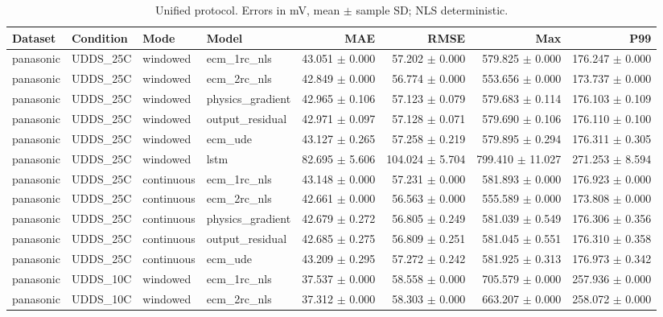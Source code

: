\begin{longtable}{llllrrrr}
\caption{Unified protocol. Errors in mV, mean $\pm$ sample SD; NLS deterministic.}\\
Dataset & Condition & Mode & Model & MAE & RMSE & Max & P99 \\
\hline
panasonic & UDDS\_25C & windowed & ecm\_1rc\_nls & 43.051 $\pm$ 0.000 & 57.202 $\pm$ 0.000 & 579.825 $\pm$ 0.000 & 176.247 $\pm$ 0.000 \\
panasonic & UDDS\_25C & windowed & ecm\_2rc\_nls & 42.849 $\pm$ 0.000 & 56.774 $\pm$ 0.000 & 553.656 $\pm$ 0.000 & 173.737 $\pm$ 0.000 \\
panasonic & UDDS\_25C & windowed & physics\_gradient & 42.965 $\pm$ 0.106 & 57.123 $\pm$ 0.079 & 579.683 $\pm$ 0.114 & 176.103 $\pm$ 0.109 \\
panasonic & UDDS\_25C & windowed & output\_residual & 42.971 $\pm$ 0.097 & 57.128 $\pm$ 0.071 & 579.690 $\pm$ 0.106 & 176.110 $\pm$ 0.100 \\
panasonic & UDDS\_25C & windowed & ecm\_ude & 43.127 $\pm$ 0.265 & 57.258 $\pm$ 0.219 & 579.895 $\pm$ 0.294 & 176.311 $\pm$ 0.305 \\
panasonic & UDDS\_25C & windowed & lstm & 82.695 $\pm$ 5.606 & 104.024 $\pm$ 5.704 & 799.410 $\pm$ 11.027 & 271.253 $\pm$ 8.594 \\
panasonic & UDDS\_25C & continuous & ecm\_1rc\_nls & 43.148 $\pm$ 0.000 & 57.231 $\pm$ 0.000 & 581.893 $\pm$ 0.000 & 176.923 $\pm$ 0.000 \\
panasonic & UDDS\_25C & continuous & ecm\_2rc\_nls & 42.661 $\pm$ 0.000 & 56.563 $\pm$ 0.000 & 555.589 $\pm$ 0.000 & 173.808 $\pm$ 0.000 \\
panasonic & UDDS\_25C & continuous & physics\_gradient & 42.679 $\pm$ 0.272 & 56.805 $\pm$ 0.249 & 581.039 $\pm$ 0.549 & 176.306 $\pm$ 0.356 \\
panasonic & UDDS\_25C & continuous & output\_residual & 42.685 $\pm$ 0.275 & 56.809 $\pm$ 0.251 & 581.045 $\pm$ 0.551 & 176.310 $\pm$ 0.358 \\
panasonic & UDDS\_25C & continuous & ecm\_ude & 43.209 $\pm$ 0.295 & 57.272 $\pm$ 0.242 & 581.925 $\pm$ 0.313 & 176.973 $\pm$ 0.342 \\
panasonic & UDDS\_10C & windowed & ecm\_1rc\_nls & 37.537 $\pm$ 0.000 & 58.558 $\pm$ 0.000 & 705.579 $\pm$ 0.000 & 257.936 $\pm$ 0.000 \\
panasonic & UDDS\_10C & windowed & ecm\_2rc\_nls & 37.312 $\pm$ 0.000 & 58.303 $\pm$ 0.000 & 663.207 $\pm$ 0.000 & 258.072 $\pm$ 0.000 \\

\end{longtable}
